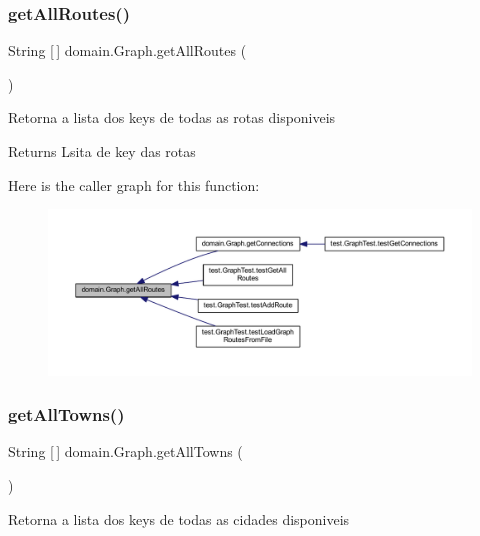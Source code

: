 \subsubsection{\texorpdfstring{get\+All\+Routes()}{getAllRoutes()}}
{\footnotesize\ttfamily String \mbox{[}$\,$\mbox{]} domain.\+Graph.\+get\+All\+Routes (\begin{DoxyParamCaption}{ }\end{DoxyParamCaption})}

Retorna a lista dos keys de todas as rotas disponiveis

\begin{DoxyReturn}{Returns}
Lsita de key das rotas 
\end{DoxyReturn}
Here is the caller graph for this function\+:\nopagebreak
\begin{figure}[H]
\begin{center}
\leavevmode
\includegraphics[width=350pt]{classdomain_1_1_graph_aa91cc429a4ea1d2c3341baea617e4028_icgraph}
\end{center}
\end{figure}
\mbox{\label{classdomain_1_1_graph_a3789a71ab36974dce8c6c6aac41007f3}} 
\subsubsection{\texorpdfstring{get\+All\+Towns()}{getAllTowns()}}
{\footnotesize\ttfamily String \mbox{[}$\,$\mbox{]} domain.\+Graph.\+get\+All\+Towns (\begin{DoxyParamCaption}{ }\end{DoxyParamCaption})}

Retorna a lista dos keys de todas as cidades disponiveis

